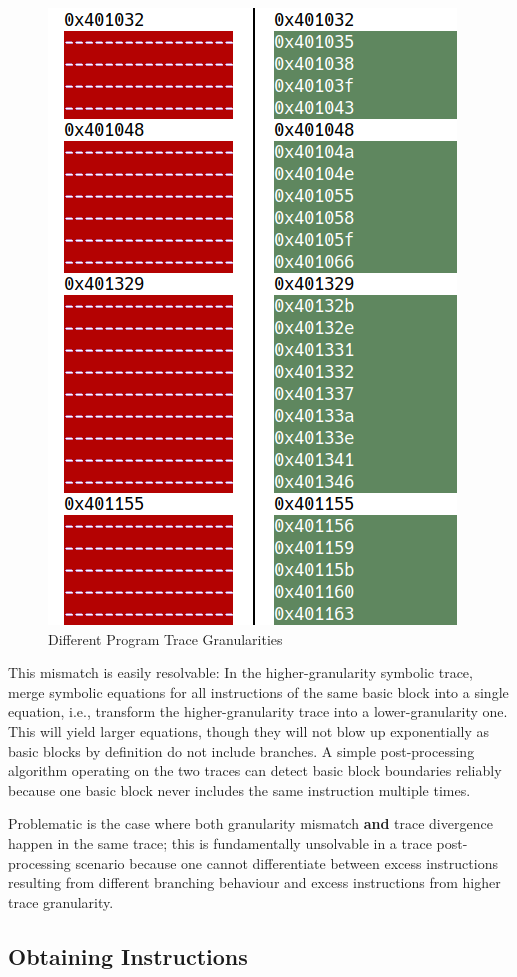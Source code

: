 \begin{figure}[htpb]
    \centering
    \includegraphics[width=0.5\linewidth]{figures/trace_diff_view.png}
    \caption{Different Program Trace Granularities}\label{fig:trace_granularity}
\end{figure}

This mismatch is easily resolvable: In the higher-granularity symbolic trace, merge symbolic equations for all
instructions of the same basic block into a single equation, i.e., transform the higher-granularity trace into a
lower-granularity one. This will yield larger equations, though they will not blow up exponentially as basic blocks by
definition do not include branches. A simple post-processing algorithm operating on the two traces can detect basic
block boundaries reliably because one basic block never includes the same instruction multiple times.

Problematic is the case where both granularity mismatch \textbf{and} trace divergence happen in the same trace; this is
fundamentally unsolvable in a trace post-processing scenario because one cannot differentiate between excess
instructions resulting from different branching behaviour and excess instructions from higher trace granularity.

\subsection{Obtaining Instructions}

